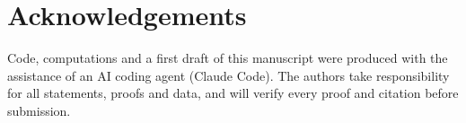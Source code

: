 \documentclass[11pt]{amsart}
\theoremstyle{definition}
\theoremstyle{remark}
\begin{document}
\section*{Acknowledgements}
Code, computations and a first draft of this manuscript were produced with the
assistance of an AI coding agent (Claude Code). The authors take
responsibility for all statements, proofs and data, and will verify every
proof and citation before submission.



\end{document}
